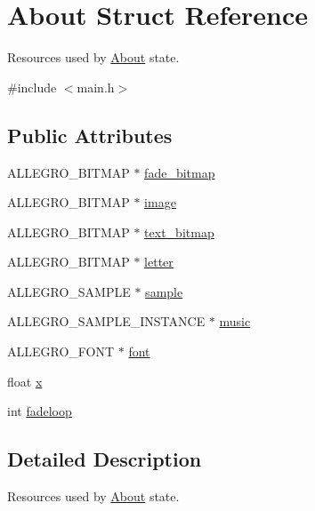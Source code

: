 \hypertarget{structAbout}{\section{\-About \-Struct \-Reference}
\label{structAbout}
}


\-Resources used by \hyperlink{structAbout}{\-About} state.  




{\ttfamily \#include $<$main.\-h$>$}

\subsection*{\-Public \-Attributes}
\begin{DoxyCompactItemize}
\item 
\-A\-L\-L\-E\-G\-R\-O\-\_\-\-B\-I\-T\-M\-A\-P $\ast$ \hyperlink{structAbout_a0c80b08e1d60093504bed342b41e51c1}{fade\-\_\-bitmap}
\item 
\-A\-L\-L\-E\-G\-R\-O\-\_\-\-B\-I\-T\-M\-A\-P $\ast$ \hyperlink{structAbout_a9e724aa84d322d2bfff5c00109492a1d}{image}
\item 
\-A\-L\-L\-E\-G\-R\-O\-\_\-\-B\-I\-T\-M\-A\-P $\ast$ \hyperlink{structAbout_a2e5dbd59393791949fd988de7b770f86}{text\-\_\-bitmap}
\item 
\-A\-L\-L\-E\-G\-R\-O\-\_\-\-B\-I\-T\-M\-A\-P $\ast$ \hyperlink{structAbout_aa46380e60629ac39d782e18dc6a08f8e}{letter}
\item 
\-A\-L\-L\-E\-G\-R\-O\-\_\-\-S\-A\-M\-P\-L\-E $\ast$ \hyperlink{structAbout_aaae3fb8b349d9973fde2156e1f86c75b}{sample}
\item 
\-A\-L\-L\-E\-G\-R\-O\-\_\-\-S\-A\-M\-P\-L\-E\-\_\-\-I\-N\-S\-T\-A\-N\-C\-E $\ast$ \hyperlink{structAbout_a4c25f6cd85f909dca5325b8825eed16c}{music}
\item 
\-A\-L\-L\-E\-G\-R\-O\-\_\-\-F\-O\-N\-T $\ast$ \hyperlink{structAbout_ad14358b4942c0260e502a65b98732f93}{font}
\item 
float \hyperlink{structAbout_a8ff1ed42ee1abd6ad45def77614015ce}{x}
\item 
int \hyperlink{structAbout_a3a7b7ae29163ae843671a2c2b5e8c1f0}{fadeloop}
\end{DoxyCompactItemize}


\subsection{\-Detailed \-Description}
\-Resources used by \hyperlink{structAbout}{\-About} state. 

